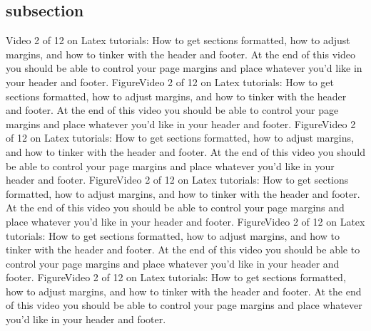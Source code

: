 \documentclass[12pt]{report}
\begin{document}
\subsection*{subsection}
Video 2 of 12 on Latex tutorials: How to get sections formatted, how to adjust margins, and how to tinker with the header and footer. At the end of this video you should be able to control your page margins and place whatever you'd like in your header and footer. FigureVideo 2 of 12 on Latex tutorials: How to get sections formatted, how to adjust margins, and how to tinker with the header and footer. At the end of this video you should be able to control your page margins and place whatever you'd like in your header and footer. FigureVideo 2 of 12 on Latex tutorials: How to get sections formatted, how to adjust margins, and how to tinker with the header and footer. At the end of this video you should be able to control your page margins and place whatever you'd like in your header and footer. FigureVideo 2 of 12 on Latex tutorials: How to get sections formatted, how to adjust margins, and how to tinker with the header and footer. At the end of this video you should be able to control your page margins and place whatever you'd like in your header and footer. FigureVideo 2 of 12 on Latex tutorials: How to get sections formatted, how to adjust margins, and how to tinker with the header and footer. At the end of this video you should be able to control your page margins and place whatever you'd like in your header and footer. FigureVideo 2 of 12 on Latex tutorials: How to get sections formatted, how to adjust margins, and how to tinker with the header and footer. At the end of this video you should be able to control your page margins and place whatever you'd like in your header and footer.
\end{document}
